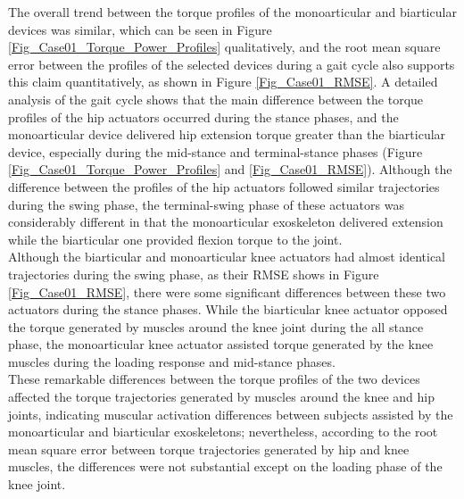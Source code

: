 \documentclass[10pt,letterpaper]{article}
\begin{document}
The overall trend between the torque profiles of the monoarticular and biarticular devices was similar, which can be seen in Figure \ref{Fig_Case01_Torque_Power_Profiles} qualitatively, and the root mean square error between the profiles of the selected devices during a gait cycle also supports this claim quantitatively, as shown in Figure \ref{Fig_Case01_RMSE}. A detailed analysis of the gait cycle shows that the main difference between the torque profiles of the hip actuators occurred during the stance phases, and the monoarticular device delivered hip extension torque greater than the biarticular device, especially during the mid-stance and terminal-stance phases (Figure \ref{Fig_Case01_Torque_Power_Profiles} and \ref{Fig_Case01_RMSE}). Although the difference between the profiles of the hip actuators followed similar trajectories during the swing phase, the terminal-swing phase of these actuators was considerably different in that the monoarticular exoskeleton delivered extension while the biarticular one provided flexion torque to the joint.\\
Although the biarticular and monoarticular knee actuators had almost identical trajectories during the swing phase, as their RMSE shows in Figure \ref{Fig_Case01_RMSE}, there were some significant differences between these two actuators during the stance phases. While the biarticular knee actuator opposed the torque generated by muscles around the knee joint during the all stance phase, the monoarticular knee actuator assisted torque generated by the knee muscles during the loading response and mid-stance phases.\\
These remarkable differences between the torque profiles of the two devices affected the torque trajectories generated by muscles around the knee and hip joints, indicating muscular activation differences between subjects assisted by the monoarticular and biarticular exoskeletons; nevertheless, according to the root mean square error between torque trajectories generated by hip and knee muscles, the differences were not substantial except on the loading phase of the knee joint.\\
\end{document}
